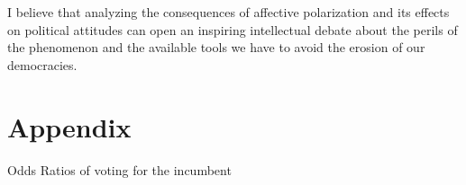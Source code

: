 \documentclass[a4paper, svgnames]{article}
\begin{document}
I believe that analyzing the consequences of affective polarization and its effects on political attitudes can open an inspiring intellectual debate about the perils of the phenomenon and the available tools we have to avoid the erosion of our democracies. 

\newpage



\newpage

\section*{Appendix}

\begin{table}[H]
\centering
\caption{Odds Ratios of voting for the incumbent}

\end{table}
\end{document}
